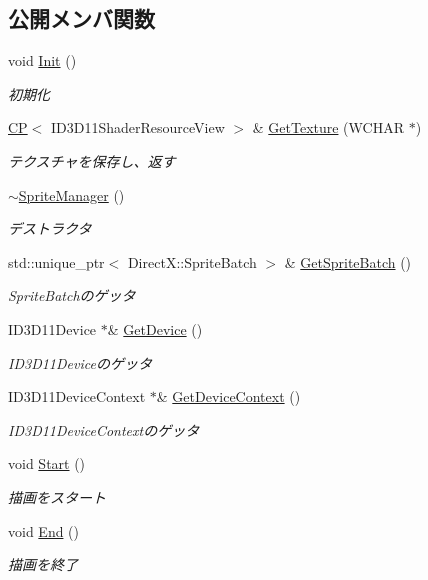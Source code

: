 \subsection*{公開メンバ関数}
\begin{DoxyCompactItemize}
\item 
void \mbox{\hyperlink{class_sprite_manager_a82941ce284548c762f250220ea58f43c}{Init}} ()
\begin{DoxyCompactList}\small\item\em 初期化 \end{DoxyCompactList}\item 
\mbox{\hyperlink{sprite__manager_8h_ab0deadee9fd38132a17560766af7fc45}{CP}}$<$ I\+D3\+D11\+Shader\+Resource\+View $>$ \& \mbox{\hyperlink{class_sprite_manager_a64bcc473169d17c3912cff9efe224115}{Get\+Texture}} (W\+C\+H\+AR $\ast$)
\begin{DoxyCompactList}\small\item\em テクスチャを保存し、返す \end{DoxyCompactList}\item 
\mbox{\hyperlink{class_sprite_manager_ae01a31b1c80f676604ba55c93b499e1f}{$\sim$\+Sprite\+Manager}} ()
\begin{DoxyCompactList}\small\item\em デストラクタ \end{DoxyCompactList}\item 
std\+::unique\+\_\+ptr$<$ Direct\+X\+::\+Sprite\+Batch $>$ \& \mbox{\hyperlink{class_sprite_manager_a0b82bacf33d0b558657c8e9841daf9d9}{Get\+Sprite\+Batch}} ()
\begin{DoxyCompactList}\small\item\em Sprite\+Batchのゲッタ \end{DoxyCompactList}\item 
I\+D3\+D11\+Device $\ast$\& \mbox{\hyperlink{class_sprite_manager_ac9e2c44cc43775d9802612bd4be9bac3}{Get\+Device}} ()
\begin{DoxyCompactList}\small\item\em I\+D3\+D11\+Deviceのゲッタ \end{DoxyCompactList}\item 
I\+D3\+D11\+Device\+Context $\ast$\& \mbox{\hyperlink{class_sprite_manager_a6bad23e380818dbe6b521adc07ab84fa}{Get\+Device\+Context}} ()
\begin{DoxyCompactList}\small\item\em I\+D3\+D11\+Device\+Contextのゲッタ \end{DoxyCompactList}\item 
void \mbox{\hyperlink{class_sprite_manager_a6b387e8736713264f6d590082cd492cb}{Start}} ()
\begin{DoxyCompactList}\small\item\em 描画をスタート \end{DoxyCompactList}\item 
void \mbox{\hyperlink{class_sprite_manager_afed8a96a6530f67123a4efa1b6d77032}{End}} ()
\begin{DoxyCompactList}\small\item\em 描画を終了 \end{DoxyCompactList}\end{DoxyCompactItemize}
